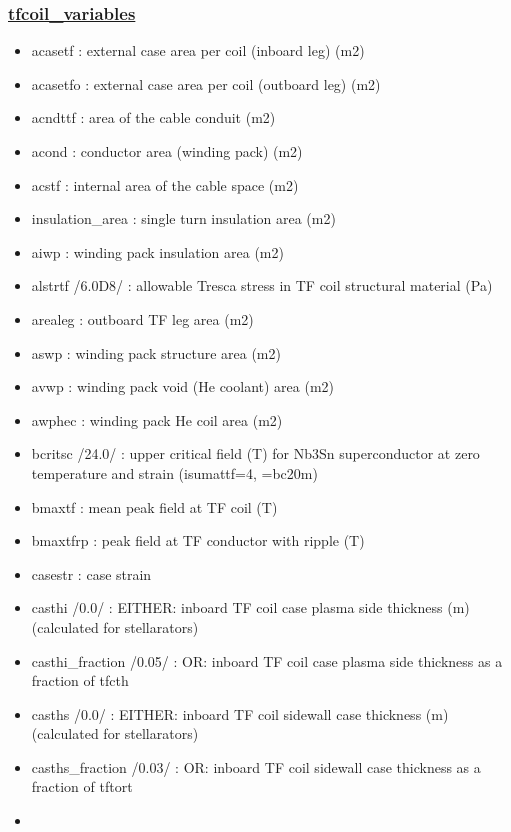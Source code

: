 \documentclass[]{article}
\begin{document}
\subsubsection{\texorpdfstring{\href{tfcoil_variables.html}{tfcoil\_variables}}{tfcoil\_variables}}\label{tfcoil_variables}

\begin{itemize}
\item
  acasetf : external case area per coil (inboard leg) (m2)
\item
  acasetfo : external case area per coil (outboard leg) (m2)
\item
  acndttf : area of the cable conduit (m2)
\item
  acond : conductor area (winding pack) (m2)
\item
  acstf : internal area of the cable space (m2)
\item
  insulation\_area : single turn insulation area (m2)
\item
  aiwp : winding pack insulation area (m2)
\item
  alstrtf /6.0D8/ : allowable Tresca stress in TF coil structural
  material (Pa)
\item
  arealeg : outboard TF leg area (m2)
\item
  aswp : winding pack structure area (m2)
\item
  avwp : winding pack void (He coolant) area (m2)
\item
  awphec : winding pack He coil area (m2)
\item
  bcritsc /24.0/ : upper critical field (T) for Nb3Sn superconductor at
  zero temperature and strain (isumattf=4, =bc20m)
\item
  bmaxtf : mean peak field at TF coil (T)
\item
  bmaxtfrp : peak field at TF conductor with ripple (T)
\item
  casestr : case strain
\item
  casthi /0.0/ : EITHER: inboard TF coil case plasma side thickness (m)
  (calculated for stellarators)
\item
  casthi\_fraction /0.05/ : OR: inboard TF coil case plasma side
  thickness as a fraction of tfcth
\item
  casths /0.0/ : EITHER: inboard TF coil sidewall case thickness (m)
  (calculated for stellarators)
\item
  casths\_fraction /0.03/ : OR: inboard TF coil sidewall case thickness
  as a fraction of tftort
\item

\end{itemize}
\end{document}
